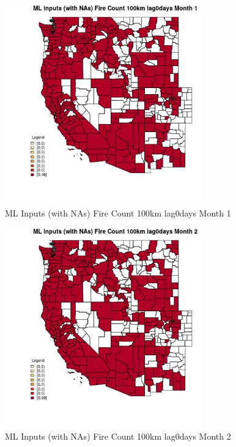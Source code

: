 \begin{figure} 
\centering  
\includegraphics[width=0.77\textwidth]{Code_Outputs/Report_ML_input_PM25_Step4_part_e_de_duplicated_aves_compiled_2019-05-21wNAs_CountyFire_Count_100km_lag0daysmedianMonth1.jpg} 
\caption{\label{fig:Report_ML_input_PM25_Step4_part_e_de_duplicated_aves_compiled_2019-05-21wNAsCountyFire_Count_100km_lag0daysmedianMonth1}ML Inputs (with NAs) Fire Count 100km lag0days Month 1} 
\end{figure} 
 

\begin{figure} 
\centering  
\includegraphics[width=0.77\textwidth]{Code_Outputs/Report_ML_input_PM25_Step4_part_e_de_duplicated_aves_compiled_2019-05-21wNAs_CountyFire_Count_100km_lag0daysmedianMonth2.jpg} 
\caption{\label{fig:Report_ML_input_PM25_Step4_part_e_de_duplicated_aves_compiled_2019-05-21wNAsCountyFire_Count_100km_lag0daysmedianMonth2}ML Inputs (with NAs) Fire Count 100km lag0days Month 2} 
\end{figure} 
 

